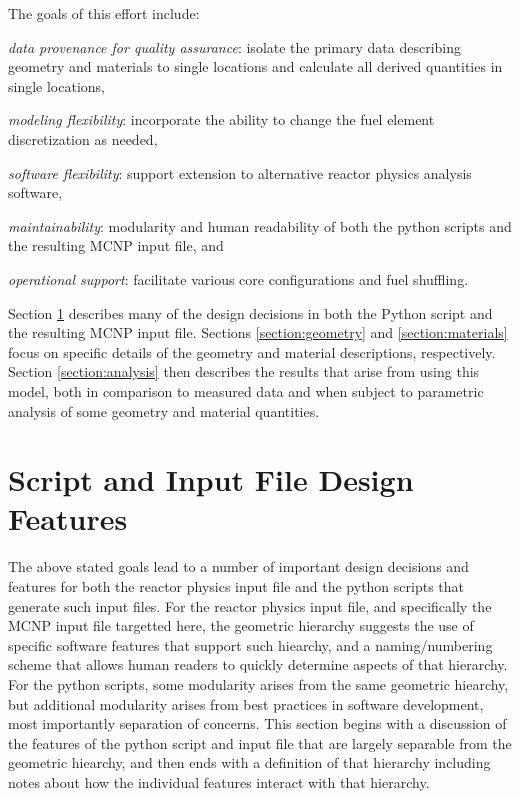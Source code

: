 \documentclass{UWNR_modeling}
\begin{document}
The goals of this effort include:\vspace{-0.9\parsep}
\begin{myitemize}
\item \textit{data provenance for quality assurance}: isolate the primary data describing geometry and materials to single locations and calculate all derived quantities in single locations,
\item \textit{modeling flexibility}: incorporate the ability to change the fuel element discretization as needed,
\item \textit{software flexibility}: support extension to alternative reactor physics analysis software,
\item \textit{maintainability}: modularity and human readability of both the python scripts and the resulting MCNP input file, and
\item \textit{operational support}: facilitate various core configurations and fuel shuffling.
\end{myitemize}

Section \ref{section:structure} describes many of the design decisions in both the Python script and the resulting MCNP input file.  Sections \ref{section:geometry} and \ref{section:materials} focus on specific details of the geometry and material descriptions, respectively.  Section \ref{section:analysis} then describes the results that arise from using this model, both in comparison to measured data and when subject to parametric analysis of some geometry and material quantities.

\section{Script and Input File Design Features}\label{section:structure}

The above stated goals lead to a number of important design decisions and features for both the reactor physics input file and the python scripts that generate such input files.  For the reactor physics input file, and specifically the MCNP input file targetted here, the geometric hierarchy suggests the use of specific software features that support such hiearchy, and a naming/numbering scheme that allows human readers to quickly determine aspects of that hierarchy.  For the python scripts, some modularity arises from the same geometric hiearchy, but additional modularity arises from best practices in software development, most importantly separation of concerns.  This section begins with a discussion of the features of the python script and input file that are largely separable from the geometric hiearchy, and then ends with a definition of that hierarchy including notes about how the individual features interact with that hierarchy.
\end{document}
